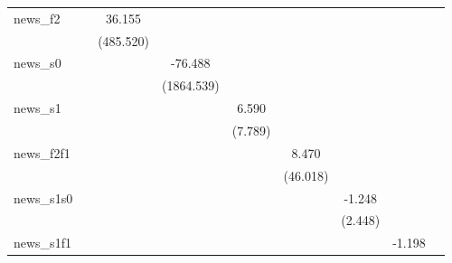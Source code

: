 {\begin{tabular}{l*{8}{c}}
\addlinespace
news\_f2     &                     &      36.155         &                     &                     &                     &                     &                     &                     \\
            &                     &   (485.520)         &                     &                     &                     &                     &                     &                     \\
\addlinespace
news\_s0     &                     &                     &     -76.488         &                     &                     &                     &                     &                     \\
            &                     &                     &  (1864.539)         &                     &                     &                     &                     &                     \\
\addlinespace
news\_s1     &                     &                     &                     &       6.590         &                     &                     &                     &                     \\
            &                     &                     &                     &     (7.789)         &                     &                     &                     &                     \\
\addlinespace
news\_f2f1   &                     &                     &                     &                     &       8.470         &                     &                     &                     \\
            &                     &                     &                     &                     &    (46.018)         &                     &                     &                     \\
\addlinespace
news\_s1s0   &                     &                     &                     &                     &                     &      -1.248         &                     &                     \\
            &                     &                     &                     &                     &                     &     (2.448)         &                     &                     \\
\addlinespace
news\_s1f1   &                     &                     &                     &                     &                     &                     &      -1.198         &                     \\

\end{tabular}}
